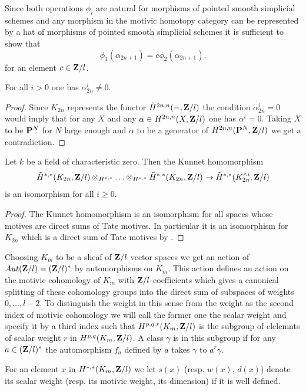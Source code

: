 \documentclass[11pt]{article}
\begin{document}
Since both operations $\phi_i$ are natural for morphisms of pointed
smooth simplicial schemes and any morphism in the motivic homotopy
category can be represented by a hat of morphisms of pointed smooth
simplicial schemes it is sufficient to show that 
%
$$\phi_1(\alpha_{2n+1})=c\phi_2(\alpha_{2n+1}).$$
%
for an element $c\in{\bf Z\rm}/l$.
%
%
\begin{lemma}
For all $i>0$ one has $\alpha_{2n}^i\ne 0$.
\end{lemma}
%
\begin{proof}
Since $K_{2n}$ represents the functor $\tilde{H}^{2n,n}(-,{\bf Z\rm}/l)$ the
condition $\alpha_{2n}^i=0$ would imply that for any $X$ and any
$\alpha\in H^{2n,n}(X,{\bf Z\rm}/l)$ one has $\alpha^i=0$. Taking $X$ to be
${\bf P}^N$ for $N$ large enough and $\alpha$ to be a generator of
$H^{2n,n}({\bf P}^N,{\bf Z\rm}/l)$ we get a contradiction.
\end{proof}
%
\begin{lemma}
 Let $k$ be a field of characteristic zero. Then the
Kunnet homomorphism
%
$$\tilde{H}^{*,*}(K_{2n},\zz/l)\oo_{H^{*,*}}\dots\oo_{H^{*,*}}\tilde{H}^{*,*}(K_{2n},\zz/l)\sr
\tilde{H}^{*,*}(K_{2n}^{\wedge i},\zz/l)$$
%
is an isomorphism for all $i\ge 0$.
\end{lemma}
%
\begin{proof}
The Kunnet homomorphism is an isomorphism for all spaces whose motives are direct sums of Tate motives. In particular it is an isomorphism for $K_{2n}$ which is a direct sum of Tate motives by \maintwo.
\end{proof}
%

Choosing $K_m$ to be a sheaf of ${\bf Z\rm}/l$ vector spaces we get an action
of $Aut({\bf Z\rm}/l)=({\bf Z\rm}/l)^*$ by automorphisms on $K_{m}$. This action
defines an action on the motivic cohomology of $K_{m}$ with
${\bf Z\rm}/l$-coefficients which gives a canonical splitting of these
cohomology groups into the direct sum of subspaces of weights
$0,\dots,l-2$. To distinguish the weight in this sense from the
weight as the second index of motivic cohomology we will call the
former one the scalar weight and specify it by a third index such that
$H^{p,q,r}(K_{m},{\bf Z\rm}/l)$ is the subgroup of elelemnts of scalar
weight $r$ in $H^{p,q}(K_{m},{\bf Z\rm}/l)$. A class $\gamma$ is in this
subgroup if for any $a\in ({\bf Z\rm}/l)^*$ the automorphism $f_a$ defined by
$a$ takes $\gamma$ to $a^r\gamma$.

For an element $x$ in $H^{*,*}(K_m,{\bf Z\rm}/l)$ we let $s(x)$
(resp. $w(x)$, $d(x)$) denote its scalar weight (resp. its motivic
weight, its dimension) if it is well defined. 
\end{document}

